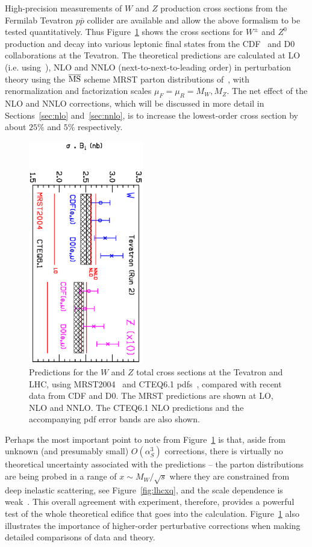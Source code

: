 \documentclass[12pt]{iopart}
\def\as{\alpha_S}
\def\msb{{\overline{\rm MS}}}
\begin{document}
High-precision measurements of $W$ and $Z$ production cross sections from the Fermilab Tevatron $p \bar p$
collider are available and allow the above formalism to be tested quantitatively. Thus Figure~\ref{fig:wz} shows
the cross sections for $ W^\pm$ and $Z^0$ production and decay
into various leptonic final states from the CDF~\cite{Acosta:2004uq}
and D0~\cite{D0WZ} collaborations at the Tevatron. The theoretical predictions are
calculated at LO (i.e. using~),
NLO and NNLO (next-to-next-to-leading order) in perturbation theory using the  $\msb$ scheme MRST parton distributions
of~\cite{Martin:2004ir},
with renormalization and factorization scales $\mu_F=\mu_R = M_W,M_Z$. The net effect of
the NLO and NNLO corrections, which will be discussed in more detail in Sections~\ref{sec:nlo} and~\ref{sec:nnlo},
is to increase the lowest-order cross section by about  $25\%$ and $5\%$ respectively.
%
\begin{figure}[t]
\begin{center}    
\includegraphics[width=5cm,angle=90]{dyxsec_tev.ps}    
\end{center}    
\caption{Predictions for the $W$ and $Z$ total cross sections at the Tevatron and LHC, 
using MRST2004~\protect\cite{Martin:2004ir} and CTEQ6.1 pdfs~\cite{Stump:2003yu},
compared with recent data from CDF and D0.
The MRST predictions are shown at LO, NLO and NNLO.
The CTEQ6.1 NLO predictions and the accompanying pdf error bands are also shown.}
\label{fig:wz}
\end{figure}

Perhaps the most important point to note from Figure~\ref{fig:wz} is that, aside from unknown (and presumably
small) $O(\as^3)$ corrections, there is virtually no theoretical uncertainty associated with the predictions --
the parton distributions are being probed in a range of $x \sim M_W/\sqrt{s}$ where they are constrained from
deep inelastic scattering, see Figure~\ref{fig:lhcxq}, and the scale dependence is weak~\cite{Martin:2004ir}.  This
overall agreement with experiment, therefore, provides a powerful test of the whole theoretical edifice that
goes into the calculation. Figure~\ref{fig:wz} also illustrates the importance of higher-order perturbative
corrections when making detailed comparisons of data and theory. 
\end{document}
